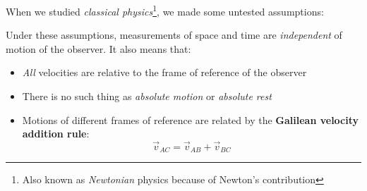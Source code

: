 %
%
%
%
%
%
%
%
When we studied \emph{classical physics}\footnote{Also known as
\emph{Newtonian} physics because of Newton's contribution}, we made some
untested assumptions:
Under these assumptions, measurements of space and time are \emph{independent}
of motion of the observer. It also means that:
\begin{itemize}
\item\emph{All} velocities are relative to the frame of reference of the
  observer
\item There is no such thing as \emph{absolute motion} or \emph{absolute rest}
\item Motions of different frames of reference are related by the
  \textbf{Galilean velocity addition rule}:
  \begin{equation*}
    \vec v_{AC}=\vec v_{AB}+\vec v_{BC}
  \end{equation*}
\end{itemize}




